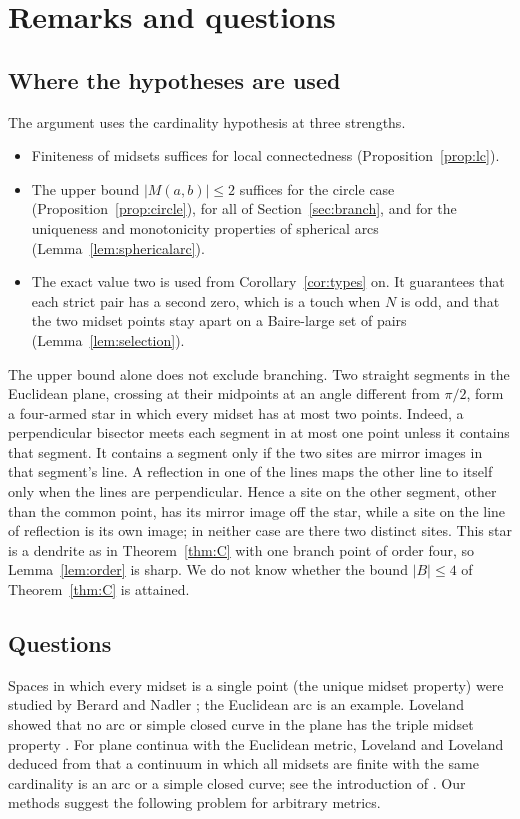 \documentclass[11pt]{amsart}
\theoremstyle{definition}
\theoremstyle{remark}
\newcommand{\M}{M}
\newcommand{\N}{N}
\begin{document}
\section{Remarks and questions}\label{sec:remarks}

\subsection{Where the hypotheses are used}
The argument uses the cardinality hypothesis at three strengths.
\begin{itemize}[leftmargin=*]
\item Finiteness of midsets suffices for local connectedness (Proposition~\ref{prop:lc}).
\item The upper bound $|\M(a,b)|\le2$ suffices for the circle case (Proposition~\ref{prop:circle}), for all of Section~\ref{sec:branch}, and for the uniqueness and monotonicity properties of spherical arcs (Lemma~\ref{lem:sphericalarc}).
\item The exact value two is used from Corollary~\ref{cor:types} on. It guarantees that each strict pair has a second zero, which is a touch when $\N$ is odd, and that the two midset points stay apart on a Baire-large set of pairs (Lemma~\ref{lem:selection}).
\end{itemize}
The upper bound alone does not exclude branching. Two straight segments in the Euclidean plane, crossing at their midpoints at an angle different from $\pi/2$, form a four-armed star in which every midset has at most two points. Indeed, a perpendicular bisector meets each segment in at most one point unless it contains that segment. It contains a segment only if the two sites are mirror images in that segment's line. A reflection in one of the lines maps the other line to itself only when the lines are perpendicular. Hence a site on the other segment, other than the common point, has its mirror image off the star, while a site on the line of reflection is its own image; in neither case are there two distinct sites. This star is a dendrite as in Theorem~\ref{thm:C} with one branch point of order four, so Lemma~\ref{lem:order} is sharp. We do not know whether the bound $|B|\le4$ of Theorem~\ref{thm:C} is attained.

\subsection{Questions}
Spaces in which every midset is a single point (the unique midset property) were studied by Berard \cite{Ber71} and Nadler \cite{Nad76}; the Euclidean arc is an example. Loveland showed that no arc or simple closed curve in the plane has the triple midset property \cite{Lov90}. For plane continua with the Euclidean metric, Loveland and Loveland deduced from \cite[Theorem~3.1]{LL92} that a continuum in which all midsets are finite with the same cardinality is an arc or a simple closed curve; see the introduction of \cite{LL92}. Our methods suggest the following problem for arbitrary metrics.
\end{document}
